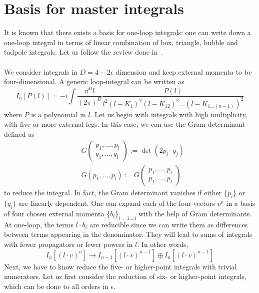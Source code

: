 \section{Basis for master integrals}
It is known that there exists a basis for one-loop integrals: one can write down a one-loop integral in terms of linear combination of box, triangle, bubble and tadpole integrals. 
Let us follow the review done in~\cite{Gluza:2010ws}.
\\\\
We consider integrals in $D= 4-2\epsilon$ dimension and keep external momenta to be four-dimensional.
A generic loop-integral can be written as
\begin{equation*}
I_n[P(l)] = 
-i\int\frac{\dd^D l}{(2\pi)^D}\frac{P(l)}{l^2(l-K_1)^2(l-K_{12})^2\ldots(l-K_{1\ldots (n-1)})^2}
\end{equation*}
where $P$ is a polynomial in $l$.
Let us begin with integrals with high multiplicity, with five or more external legs.
In this case, we can use the Gram determinant defined as
\begin{equation*}
\begin{split}
& G\begin{pmatrix}
p_1,\ldots, p_l \\
q_1,\ldots, q_l 
\end{pmatrix}
:= \det(2p_i\cdot q_j)
\\
& G(p_1, \ldots , p_l) := G\begin{pmatrix}
p_1,\ldots, p_l \\
p_1,\ldots, p_l 
\end{pmatrix}
\end{split}
\end{equation*} 
to reduce the integral.
In fact, the Gram determinant vanishes if either $\{p_i\}$ or $\{q_i\}$ are linearly dependent.
One can expand each of the four-vectors $v^\mu$ in a basis of four chosen external momenta $\{b_i\}_{i=1\ldots 4}$ with the help of Gram determinants.
At one-loop, the terms $l\cdot b_i$ are reducible since we can write them as differences between terms appearing in the denominator.
They will lead to sums of integrals with fewer propagators or fewer powers in $l$. 
In other words, 
\begin{equation*}
I_n[(l\cdot v)^n] \rightarrow I_{n-1}[(l\cdot v)^{n-1}]\oplus I_n[(l\cdot v)^{n-1}]
\end{equation*}
Next, we have to know reduce the five- or higher-point integrals with trivial numerators. 
Let us first consider the reduction of six- or higher-point integrals, which can be done to all orders in $\epsilon$. 
